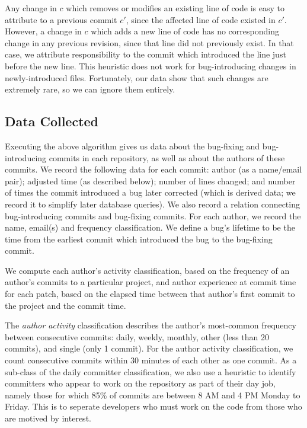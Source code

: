 Any change in $c$ which removes or modifies an existing line of code is easy to
attribute to a previous commit $c'$, since the affected line of code existed in
$c'$. However, a change in $c$ which adds a new line of code has no
corresponding change in any previous revision, since that line did not
previously exist. In that case, we attribute responsibility to the commit which
introduced the line just before the new line. This heuristic does not work for
bug-introducing changes in newly-introduced files. Fortunately, our data show
that such changes are extremely rare, so we can ignore them entirely.

\subsection{Data Collected}
\label{sec:data}

Executing the above algorithm gives us data about the bug-fixing and
bug-introducing commits in each repository, as well as about the authors of
these commits.  We record the following data for each commit: author (as a
name/email pair); adjusted time (as described below); number of lines changed;
and number of times the commit introduced a bug later corrected (which is
derived data; we record it to simplify later database queries). We also record a
relation connecting bug-introducing commits and bug-fixing commits. For each
author, we record the name, email(s) and frequency classification. We define a
bug's lifetime to be the time from the earliest commit which introduced the bug
to the bug-fixing commit.

We compute each author's activity classification, based on the frequency of an
author's commits to a particular project, and author experience at commit time
for each patch, based on the elapsed time between that author's first commit to
the project and the commit time.

The {\em author activity} classification describes the author's most-common
frequency between consecutive commits: daily, weekly, monthly, other (less than
20 commits), and single (only 1 commit). For the author activity classification,
we count consecutive commits within 30 minutes of each other as one commit. As a
sub-class of the daily committer classification, we also use a heuristic to
identify committers who appear to work on the repository as part of their day
job, namely those for which 85\% of commits are between 8 AM and 4 PM Monday to
Friday. This is to seperate developers who must work on the code from those who
are motived by interest.

